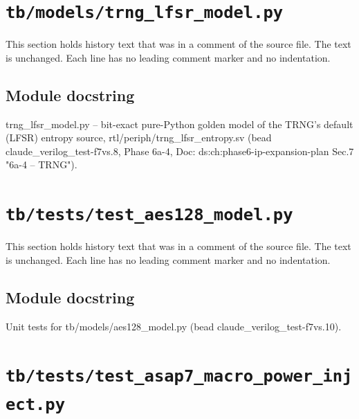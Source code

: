 \section{\texttt{tb/models/trng\_lfsr\_model.py}}\label{cr:suite:trng-lfsr-model}

This section holds history text that was in a comment of the source file. The text is unchanged. Each line has no leading comment marker and no indentation.

\begin{record}

\subsection*{Module docstring}

\begin{textblock}
trng_lfsr_model.py -- bit-exact pure-Python golden model of the TRNG's default (LFSR) entropy
source, rtl/periph/trng_lfsr_entropy.sv (bead claude_verilog_test-f7vs.8, Phase 6a-4,
Doc: ds:ch:phase6-ip-expansion-plan Sec.7 "6a-4 -- TRNG").
\end{textblock}

\end{record}

\section{\texttt{tb/tests/test\_aes128\_model.py}}\label{cr:suite:test-aes128-model}

This section holds history text that was in a comment of the source file. The text is unchanged. Each line has no leading comment marker and no indentation.

\begin{record}

\subsection*{Module docstring}

\begin{textblock}
Unit tests for tb/models/aes128_model.py (bead claude_verilog_test-f7vs.10).
\end{textblock}

\end{record}

\section{\texttt{tb/tests/test\_asap7\_macro\_power\_inject.py}}\label{cr:suite:test-asap7-macro-power-inject}

